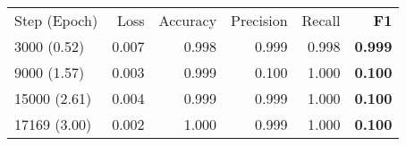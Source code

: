 \begin{table}[H]
\centering
{}
\label{tab:bert_base}
\begin{tabular}{@{}lrrrrr@{}}
\toprule
Step (Epoch) & Loss & Accuracy & Precision & Recall & \textbf{F1} \\
\cmidrule(lr){2-6} 
3000 (0.52) & 0.007 & 0.998 & 0.999 & 0.998 & \textbf{0.999} \\
9000 (1.57) & 0.003 & 0.999 & 0.100 & 1.000 & \textbf{0.100} \\
15000 (2.61) & 0.004 & 0.999 & 0.999 & 1.000 & \textbf{0.100} \\
17169 (3.00) & 0.002 & 1.000 & 0.999 & 1.000 & \textbf{0.100} \\
\bottomrule
\end{tabular}
\end{table}